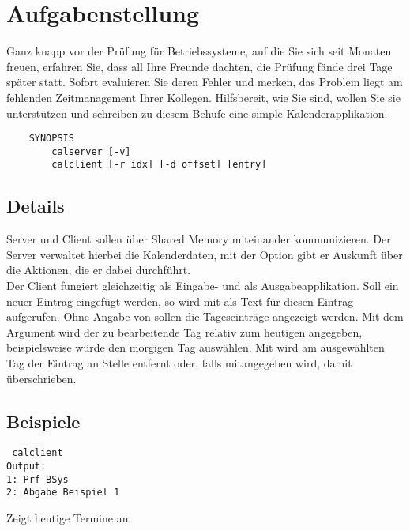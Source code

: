 




\section*{Aufgabenstellung}

Ganz knapp vor der Prüfung für Betriebssysteme, auf die Sie sich seit 
Monaten freuen, erfahren Sie, dass all Ihre Freunde dachten, die Prüfung fände 
drei Tage später statt. Sofort evaluieren Sie deren Fehler und merken, das Problem
liegt am fehlenden Zeitmanagement Ihrer Kollegen. Hilfsbereit, wie Sie sind, wollen 
Sie sie unterstützen und schreiben zu diesem Behufe eine simple Kalenderapplikation.

\begin{verbatim}
    SYNOPSIS
        calserver [-v]
        calclient [-r idx] [-d offset] [entry]
\end{verbatim}

\subsection*{Details}

Server und Client sollen über Shared Memory miteinander 
kommunizieren. Der Server verwaltet hierbei die Kalenderdaten, 
mit der Option  gibt er Auskunft über die Aktionen, 
die er dabei durchführt.\\
Der Client fungiert gleichzeitig als Eingabe- und als Ausgabeapplikation. 
Soll ein neuer Eintrag eingefügt werden, so wird  mit 
 als Text für diesen Eintrag aufgerufen. Ohne Angabe von  
sollen die Tageseinträge angezeigt werden.
Mit dem Argument  wird der zu bearbeitende Tag relativ zum heutigen
angegeben, beispielsweise würde  den morgigen Tag auswählen. Mit 
 wird am ausgewählten Tag der Eintrag an Stelle  entfernt 
oder, falls  mitangegeben wird, damit überschrieben.

\subsection*{Beispiele}

\begin{verbatim} calclient 
Output: 
1: Prf BSys
2: Abgabe Beispiel 1
\end{verbatim}
Zeigt heutige Termine an.

